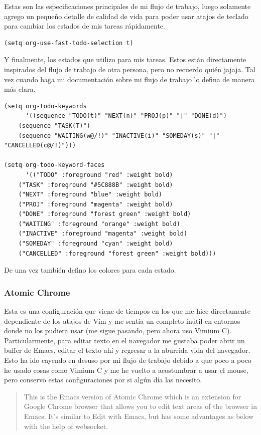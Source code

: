 \documentclass[11pt]{article}
\begin{document}
Estas son las especificaciones principales de mi flujo de trabajo, luego solamente agrego un pequeño detalle de calidad de vida para poder usar atajos de teclado para cambiar los estados de mis tareas rápidamente.

\begin{verbatim}
(setq org-use-fast-todo-selection t)
\end{verbatim}

Y finalmente, los estados que utilizo para mis tareas. Estos están directamente inspirados del flujo de trabajo de otra persona, pero no recuerdo quién jajaja. Tal vez cuando haga mi documentación sobre mi flujo de trabajo lo defina de manera más clara.

\begin{verbatim}
(setq org-todo-keywords
      '((sequence "TODO(t)" "NEXT(n)" "PROJ(p)" "|" "DONE(d)")
	(sequence "TASK(T)")
	(sequence "WAITING(w@/!)" "INACTIVE(i)" "SOMEDAY(s)" "|" "CANCELLED(c@/!)")))

(setq org-todo-keyword-faces
      '(("TODO" :foreground "red" :weight bold)
	("TASK" :foreground "#5C888B" :weight bold)
	("NEXT" :foreground "blue" :weight bold)
	("PROJ" :foreground "magenta" :weight bold)
	("DONE" :foreground "forest green" :weight bold)
	("WAITING" :foreground "orange" :weight bold)
	("INACTIVE" :foreground "magenta" :weight bold)
	("SOMEDAY" :foreground "cyan" :weight bold)
	("CANCELLED" :foreground "forest green" :weight bold)))
\end{verbatim}

De una vez también defino los colores para cada estado.
\subsubsection{Atomic Chrome}
\label{sec:org9913e53}

Esta es una configuración que viene de tiempos en los que me hice directamente dependiente de los atajos de Vim y me sentía un completo inútil en entornos donde no los pudiera usar (me sigue pasando, pero ahora uso Vimium C). Particularmente, para editar texto en el navegador me gustaba poder abrir un buffer de Emacs, editar el texto ahí y regresar a la aburrida vida del navegador. Esto ha ido cayendo en desuso por mi flujo de trabajo debido a que poco a poco he usado cosas como Vimium C y me he vuelto a acostumbrar a usar el mouse, pero conservo estas configuraciones por si algún día las necesito.

\begin{quote}
This is the Emacs version of Atomic Chrome which is an extension for Google Chrome browser that allows you to edit text areas of the browser in Emacs. It's similar to Edit with Emacs, but has some advantages as below with the help of websocket.
\end{quote}
\end{document}
